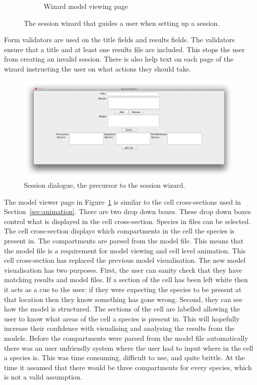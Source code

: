 \begin{figure}[h!]
\begin{subfigure}[b]{0.4\textwidth}
        \caption{Wizard model viewing page}
        \label{fig:page_4}
    \end{subfigure}
    \caption{The session wizard that guides a user when setting up a session.}
    \label{fig:session_wizard}
\end{figure}

Form validators are used on the title fields and results fields.  The validators ensure that a title and at least one results file are included.  This stops the user from creating an invalid session.  There is also help text on each page of the wizard instructing the user on what actions they should take.

\begin{figure}[h!]
    \centering
    \includegraphics[height=0.5\textwidth]{images/old_wizard.png}
    \caption{Session dialogue, the precursor to the session wizard.}
    \label{fig:old_session_dialogue}
\end{figure}

The model viewer page in Figure~\ref{fig:page_4} is similar to the cell cross-sections used in Section~\ref{sec:animation}.  There are two drop down boxes.  These drop down boxes control what is displayed in the cell cross-section.  Species in files can be selected.  The cell cross-section displays which compartments in the cell the species is present in.  The compartments are parsed from the model file.  This means that the model file is a requirement for model viewing and cell level animation.  This cell cross-section has replaced the previous model visualisation.  The new model visualisation has two purposes. First, the user can sanity check that they have matching results and model files.  If a section of the cell has been left white then it acts as a cue to the user: if they were expecting the species to be present at that location then they know something has gone wrong.  Second, they can see how the model is structured.  The sections of the cell are labelled allowing the user to know what areas of the cell a species is present in.  This will hopefully increase their confidence with visualising and analysing the results from the models. Before the compartments were parsed from the model file automatically there was an user unfriendly system where the user had to input where in the cell a species is.  This was time consuming, difficult to use, and quite brittle.  At the time it assumed that there would be three compartments for every species, which is not a valid assumption.


